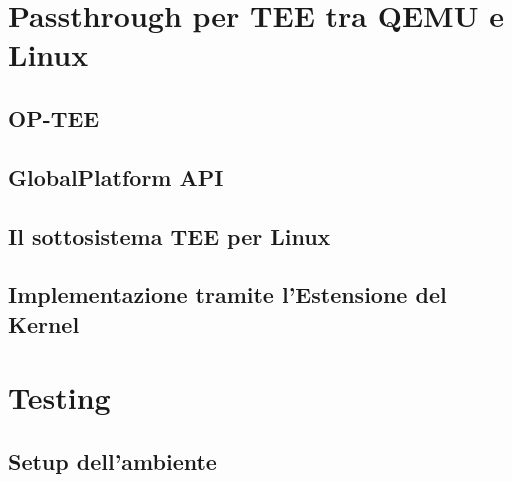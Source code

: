 \documentclass[12pt,italian]{report}
\begin{document}
\chapter{Passthrough per TEE tra QEMU e Linux}
\label{chap:passthrough-tee-qemu-linux}

\section{OP-TEE}
\label{sec:architettura-op-tee}

\section{GlobalPlatform API}
\label{sec:global-platform-api}

\section{Il sottosistema TEE per Linux}
\label{sec:sottosistema-tee-per-linux}

\section{Implementazione tramite l'Estensione del Kernel}
\label{sec:implementazione-passthrough-tramite-kernel-module}

\chapter{Testing}
\label{chap:testing}

\section{Setup dell'ambiente}
\label{sec:setup-ambiente}
\end{document}
